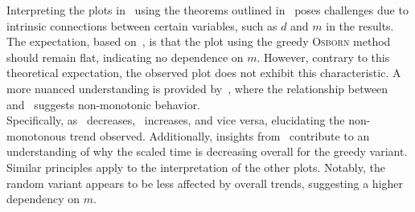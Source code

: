 Interpreting the plots in~ using the theorems outlined in~ poses challenges due to intrinsic connections between certain variables, such as \(d\) and \(m\) in the results. The expectation, based on~, is that the plot using the greedy \textsc{Osborn} method should remain flat, indicating no dependence on \(m\). However, contrary to this theoretical expectation, the observed plot does not exhibit this characteristic. A more nuanced understanding is provided by~, where the relationship between~ and~ suggests non-monotonic behavior.\\

Specifically, as~ decreases,~ increases, and vice versa, elucidating the non-monotonous trend observed. Additionally, insights from~ contribute to an understanding of why the scaled time is decreasing overall for the greedy variant. Similar principles apply to the interpretation of the other plots. Notably, the random variant appears to be less affected by overall trends, suggesting a higher dependency on \(m\).\\

